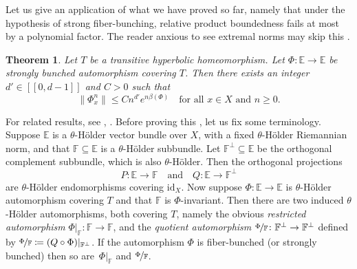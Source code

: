 \documentclass[JEP,XML,SOM,Unicode]{cedram}
\newcommand{\ldbrack}{[\![}
\newcommand{\rdbrack}{]\!]}
\def\vcentcolon{\mathrel{\mathop\ordinarycolon}}
\providecommand\ordinarycolon{:}
\providecommand*\coloneqq{\vcentcolon\mathrel{\mkern-1.2mu}=}
\theoremstyle{plain}
\newtheorem{theorem}{Theorem}[section]
\theoremstyle{definition}
\newcommand{\EE}{\mathbb{E}}
\newcommand{\FF}{\mathbb{F}}
\newcommand{\id}{\mathrm{id}}
\begin{document}
Let us give an application of what we have proved so far, namely that under the hypothesis of strong fiber-bunching, relative product boundedness fails at most by a polynomial factor.
The reader anxious to see extremal norms may skip this .

\begin{theorem}\label{t.polynomial}
Let $T$ be a transitive hyperbolic homeomorphism.
Let $\Phi \colon \EE \to \EE$ be strongly bunched automorphism covering $T$.
Then there exists an integer $d' \in \ldbrack 0, d-1 \rdbrack$ and $C>0$ such that
\[
\|\Phi_x^n\| \le C n^{d'} e^{n \beta(\Phi)} \quad \text{for all $x\in X$ and $n \ge 0$.}
\]
\end{theorem}

For related results, see \cite[Th.\,3.10]{KalSad}, \cite[\S3.5--3.6]{Jungers}. Before proving this , let us fix some terminology.
Suppose $\EE$ is a $\theta$-Hölder vector bundle over $X$, with a fixed $\theta$-Hölder Riemannian norm,
and that $\FF \subseteq \EE$ is a $\theta$-Hölder subbundle.
Let $\FF^\perp \subseteq \EE$ be the orthogonal complement subbundle, which is also $\theta$-Hölder.
Then the orthogonal projections
\begin{equation}\label{e.projections}
P \colon \EE \to \FF \quad \text{and} \quad Q \colon \EE \to \FF^\perp
\end{equation}
are $\theta$-Hölder endomorphisms covering $\id_X$.
Now suppose $\Phi \colon \EE \to \EE$ is $\theta$-Hölder automorphism covering $T$ and that $\FF$ is $\Phi$-invariant.
Then there are two induced $\theta$-Hölder automorphisms, both covering $T$, namely the obvious \emph{restricted automorphism} $\Phi|_\FF \colon \FF \to \FF$, and the \emph{quotient automorphism} $\nicefrac{\Phi}{\FF} \colon \FF^\perp \to \FF^\perp$ defined by $\nicefrac{\Phi}{\FF} \coloneqq (Q \circ \Phi )|_{\FF^\perp}$.
If the automorphism $\Phi$ is fiber-bunched (or strongly bunched) then so are~$\Phi|_\FF$ and $\nicefrac{\Phi}{\FF}$.
\end{document}
